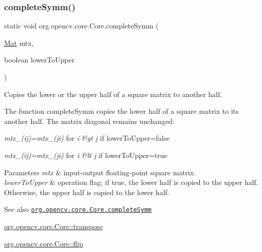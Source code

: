 \subsubsection{\texorpdfstring{complete\+Symm()}{completeSymm()}\hspace{0.1cm}{\footnotesize\ttfamily [1/2]}}
{\footnotesize\ttfamily static void org.\+opencv.\+core.\+Core.\+complete\+Symm (\begin{DoxyParamCaption}\item[{\mbox{\hyperlink{classorg_1_1opencv_1_1core_1_1_mat}{Mat}}}]{mtx,  }\item[{boolean}]{lower\+To\+Upper }\end{DoxyParamCaption})\hspace{0.3cm}{\ttfamily [static]}}

Copies the lower or the upper half of a square matrix to another half.

The function {\ttfamily complete\+Symm} copies the lower half of a square matrix to its another half. The matrix diagonal remains unchanged\+:


\begin{DoxyItemize}
\item {\itshape mtx\+\_\+(ij)=mtx\+\_\+(ji)} for {\itshape i \&gt j} if {\ttfamily lower\+To\+Upper=false} 
\item {\itshape mtx\+\_\+(ij)=mtx\+\_\+(ji)} for {\itshape i \&lt j} if {\ttfamily lower\+To\+Upper=true} 
\end{DoxyItemize}


\begin{DoxyParams}{Parameters}
{\em mtx} & input-\/output floating-\/point square matrix. \\
\hline
{\em lower\+To\+Upper} & operation flag; if true, the lower half is copied to the upper half. Otherwise, the upper half is copied to the lower half.\\
\hline
\end{DoxyParams}
\begin{DoxySeeAlso}{See also}
\href{http://docs.opencv.org/modules/core/doc/operations_on_arrays.html#completesymm}{\tt org.\+opencv.\+core.\+Core.\+complete\+Symm} 

\mbox{\hyperlink{classorg_1_1opencv_1_1core_1_1_core_a4536de6a43f5dfb4d4ba1bf24735696a}{org.\+opencv.\+core.\+Core\+::transpose}} 

\mbox{\hyperlink{classorg_1_1opencv_1_1core_1_1_core_a8dc68bbfca84b4fdfb9cd7bd79fc893e}{org.\+opencv.\+core.\+Core\+::flip}} 
\end{DoxySeeAlso}
\mbox{\label{classorg_1_1opencv_1_1core_1_1_core_a57f226ca886a32a25619bd0eb17df076}} 
